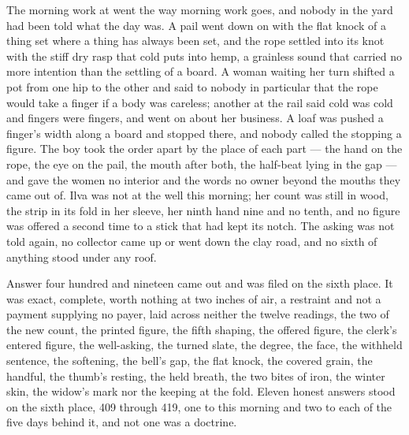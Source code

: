 The morning work at  went the way morning work goes, and nobody in the yard had been told what the day was. A pail went down on  with the flat knock of a thing set where a thing has always been set, and the rope settled into its knot with the stiff dry rasp that cold puts into hemp, a grainless sound that carried no more intention than the settling of a board. A woman waiting her turn shifted a pot from one hip to the other and said to nobody in particular that the rope would take a finger if a body was careless; another at the rail said cold was cold and fingers were fingers, and went on about her business. A loaf was pushed a finger's width along a board and stopped there, and nobody called the stopping a figure. The boy took the order apart by the place of each part --- the hand on the rope, the eye on the pail, the mouth after both, the half-beat lying in the gap --- and gave the women no interior and the words no owner beyond the mouths they came out of. Ilva was not at the well this morning; her count was still in wood, the strip in its fold in her sleeve, her ninth hand nine and no tenth, and no figure was offered a second time to a stick that had kept its notch. The asking was not told again, no collector came up or went down the clay road, and no sixth of anything stood under any roof.

\scenebreak

Answer four hundred and nineteen came out and was filed on the sixth place. It was exact, complete, worth nothing at two inches of air, a restraint and not a payment supplying no payer, laid across neither the twelve readings, the two of the new count, the printed figure, the fifth shaping, the offered figure, the clerk's entered figure, the well-asking, the turned slate, the degree, the face, the withheld sentence, the softening, the bell's gap, the flat knock, the covered grain, the handful, the thumb's resting, the held breath, the two bites of iron, the winter skin, the widow's mark nor the keeping at the fold. Eleven honest answers stood on the sixth place, 409 through 419, one to this morning and two to each of the five days behind it, and not one was a doctrine.

